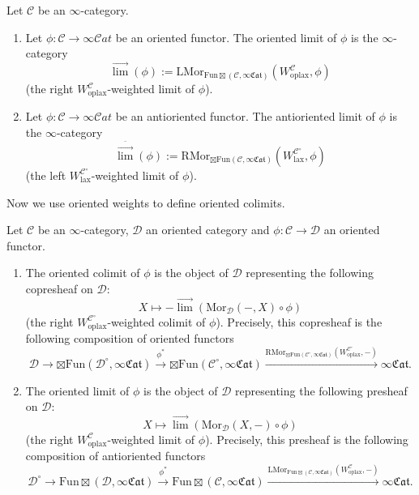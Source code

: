 \documentclass[10pt,oneside]{article}
\numberwithin{equation}{section} %
\numberwithin{figure}{section} %
\theoremstyle{plain}
\theoremstyle{definition}
\newcommand{\mC}{{\mathcal C}}
\newcommand{\mD}{{\mathcal D}}
\renewcommand{\L}{{\mathrm L}}
\newcommand{\R}{{\mathrm R}}
\newcommand{\W}{W}
\newcommand{\Fun}{\mathrm{Fun}}
\newcommand{\lax}{{\mathrm{lax}}}
\newcommand{\oplax}{{\mathrm{oplax}}}
\newcommand{\Mor}{{\mathrm{Mor}}}
\newcommand{\scat}{\mathcal{C}\mathit{at}}
\begin{document}
\begin{definition}
Let $\mC$ be an $\infty$-category.

\begin{enumerate}[\normalfont(1)]\setlength{\itemsep}{-2pt}

\item Let $\phi: \mC \to \infty\scat$ be an oriented functor.
The oriented limit of $\phi$ is the $\infty$-category
$$ \overset{\to}{\lim}(\phi):=\L\Mor_{\Fun\boxtimes(\mC,\infty\mathfrak{Cat})}(\W^{\mC}_\oplax, \phi)$$
(the right $\W^{\mC}_\oplax$-weighted limit of $\phi$).

\item Let $\phi: \mC \to \infty\scat$ be an antioriented functor.
The antioriented limit of $\phi$ is the $\infty$-category
$$ \overset{\bar{\to}}{\lim}(\phi):=\R\Mor_{\boxtimes\Fun(\mC,\infty\mathfrak{Cat})}(\W^{\mC^\circ}_\lax, \phi)$$
(the left $\W^{\mC^\circ}_\lax$-weighted limit of $\phi$).

\end{enumerate}


Now we use oriented weights to define oriented colimits.

\begin{definition}

Let $\mC$ be an $\infty$-category, $\mD$ an oriented category and $\phi: \mC \to \mD$ an oriented functor. 

\begin{enumerate}[\normalfont(1)]\setlength{\itemsep}{-2pt}

\item The oriented colimit of $\phi$ is the object of $\mD$ representing the following copresheaf on $\mD:$
$$ X \mapsto \mathrm{-} \overset{\to}{\lim}(\mathrm{Mor}_\mD(-,X)\circ \phi)$$
(the right $\W^{\mC^\circ}_\oplax$-weighted colimit of $\phi$).
Precisely, this copresheaf is the following composition of oriented functors
$$ \mD \to {\boxtimes\Fun}(\mD^\circ,\infty\mathfrak{Cat}) \xrightarrow{\phi^*} {\boxtimes\Fun}(\mC^\circ,\infty\mathfrak{Cat}) \xrightarrow{\R\Mor_{\boxtimes\Fun(\mC^\circ,\infty\mathfrak{Cat})}(\W^{\mC^\circ}_\oplax, -)} \infty\mathfrak{Cat}.$$

\item The oriented limit of $\phi$ is the object of $\mD$ representing the following presheaf on $\mD:$
$$ X \mapsto \overset{\to}{\lim}(\mathrm{Mor}_\mD(X,-)\circ \phi)$$
(the right $\W^{\mC}_\oplax$-weighted limit of $\phi$).
Precisely, this presheaf is the following composition of antioriented functors
$$ \mD^\circ \to {\Fun\boxtimes}(\mD,\infty\mathfrak{Cat}) \xrightarrow{\phi^*} {\Fun\boxtimes}(\mC,\infty\mathfrak{Cat}) \xrightarrow{\L\Mor_{\Fun\boxtimes(\mC,\infty\mathfrak{Cat})}(\W^{\mC}_\oplax, -)} \infty\mathfrak{Cat}.$$

\end{enumerate}

\end{definition}

\end{definition}
\end{document}
